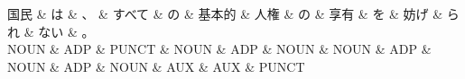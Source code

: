 \documentclass[tikz,border=5pt]{standalone}
\begin{document}
\normalsize
\begin{dependency}[edge unit distance=12.0pt]
    \begin{deptext}[column sep=1em]
        国民 \& は \& 、 \& すべて \& の \& 基本的 \& 人権 \& の \& 享有 \& を \& 妨げ \& られ \& ない \& 。\\
        NOUN \& ADP \& PUNCT \& NOUN \& ADP \& NOUN \& NOUN \& ADP \& NOUN \& ADP \& NOUN \& AUX \& AUX \& PUNCT\\
    \end{deptext}
\end{dependency}
\end{document}
